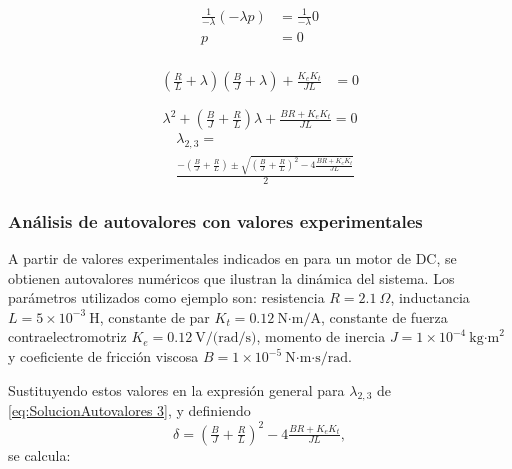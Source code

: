 \begin{equation*}
  \begin{aligned}
    \frac1{-\lambda}\left(-\lambda p\right)
     &=\frac1{-\lambda}0\\
    p &=0\\
  \end{aligned}
\end{equation*}

\begin{equation}
  \begin{aligned}
    \left(\tfrac{R}{L}+\lambda\right)\left(\tfrac{B}{J}+\lambda\right)
    +\tfrac{K_e K_t}{JL} &=0
     \label{eq:SolucionAutovalores 2}
  \end{aligned}
\end{equation}

\begin{equation*}
      \lambda^2 + \left(\tfrac{B}{J} + \tfrac{R}{L}\right)\lambda
    +\tfrac{BR+K_e K_t}{JL} =0
\end{equation*}
\begin{equation}
  \begin{aligned}
    &\lambda_{2,3} = \\
    &\frac{
      - \left( \tfrac{B}{J} + \tfrac{R}{L} \right)
      \pm \sqrt{
        \left( \tfrac{B}{J} + \tfrac{R}{L} \right)^2
        - 4 \tfrac{BR+K_e K_t}{JL}
      }
    }
    {2}
  \end{aligned}
     \label{eq:SolucionAutovalores 3}
\end{equation}

\subsubsection{Análisis de autovalores con valores experimentales}

A partir de valores experimentales indicados en \cite{Ugurlu2025} para un motor de DC, se obtienen autovalores numéricos que ilustran la dinámica del sistema. Los parámetros utilizados como ejemplo son: resistencia $R = 2.1\ \Omega$, inductancia $L = 5\times10^{-3}\ \text{H}$, constante de par $K_t = 0.12\ \text{N·m/A}$, constante de fuerza contraelectromotriz $K_e = 0.12\ \text{V/(rad/s)}$, momento de inercia $J = 1\times10^{-4}\ \text{kg·m}^2$ y coeficiente de fricción viscosa $B = 1\times10^{-5}\ \text{N·m·s/rad}$.

Sustituyendo estos valores en la expresión general para $\lambda_{2,3}$ de \eqref{eq:SolucionAutovalores 3}, y definiendo  
\[
\delta = \left(\tfrac{B}{J} + \tfrac{R}{L}\right)^2 - 4 \tfrac{BR+K_e K_t}{JL},
\]  
se calcula:

